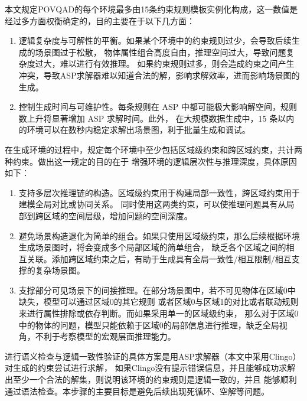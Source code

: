 本文规定POVQAD的每个环境最多由15条约束规则模板实例化构成，这一数值是经过多方面权衡确定的，目的主要在于以下几方面：
\begin{enumerate}[itemsep=0pt,parsep=0pt]
\item 逻辑复杂度与可解性的平衡。如果某个环境中的约束规则过少，会导致后续生成的场景图过于松散，
物体属性组合高度自由，推理空间过大，导致问题复杂度过大，难以进行有效推理。
如果约束规则过多，则会造成约束之间产生冲突，导致ASP求解器难以知道合法的解，影响求解效率，进而影响场景图的生成。
\item 控制生成时间与可维护性。每条规则在 ASP 中都可能极大影响解空间，规则数上升将显著增加 ASP 求解时间。此外，
在大规模数据生成中，15 条以内的环境可以在数秒内稳定求解出场景图，利于批量生成和调试。
\end{enumerate}

在生成环境的过程中，规定每个环境中至少包括区域级约束和跨区域约束，共计两种约束。做出这一规定的目的在于
增强环境的逻辑层次性与推理深度，具体原因如下：
\begin{enumerate}[itemsep=0pt,parsep=0pt]
\item 支持多层次推理链的构造。区域级约束用于构建局部一致性，跨区域约束用于建模全局对比或协同关系。
同时使用这两类约束，可以使推理问题具有从局部到跨区域的空间层级，增加问题的空间深度。
\item 避免场景构造退化为简单的组合。如果只使用区域级约束，那么后续根据环境生成场景图时，将会变成多个局部区域的简单组合，
缺乏各个区域之间的相互关联。添加跨区域约束之后，有助于生成具有全局一致性/相互限制/相互支撑的复杂场景图。
\item 支撑部分可见场景下的间接推理。在部分场景图中，若不可见物体在区域0中缺失，模型可以通过区域0的其它规则
或者区域0与区域1的对比或者联动规则来进行属性排除或依存判断。而如果采用单一的区域级约束，
那么对于区域0中的物体的问题，模型只能依赖于区域0的局部信息进行推理，缺乏全局视角，不利于考察模型的宏观层面推理能力。
\end{enumerate}

进行语义检查与逻辑一致性验证的具体方案是用ASP求解器（本文中采用Clingo）对生成的约束尝试进行求解，
如果Clingo没有提示错误信息，并且能够成功求解出至少一个合法的解集，则说明该环境的约束规则是逻辑一致的，并且
能够顺利通过语法检查。本步骤的主要目标是避免后续出现死循环、空解等问题。

